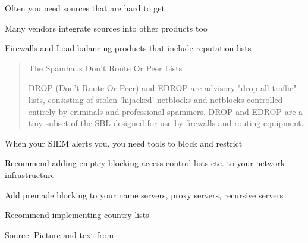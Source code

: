 \documentclass[Screen16to9,17pt]{foils}
\begin{document}
\begin{list2}
\item Often you need sources that are hard to get
\item Many vendors integrate sources into other products too
\item Firewalls and Load balancing products that include reputation lists
\end{list2}


\begin{quote}
The Spamhaus Don't Route Or Peer Lists

DROP (Don't Route Or Peer) and EDROP are advisory "drop all traffic" lists, consisting of stolen 'hijacked' netblocks and netblocks controlled entirely by criminals and professional spammers. DROP and EDROP are a tiny subset of the SBL designed for use by firewalls and routing equipment.
\end{quote}



\begin{list2}
\item When your SIEM alerts you, you need tools to block and restrict
\item Recommend adding emptry blocking access control lists etc. to your network infrastructure
\item Add premade blocking to your name servers, proxy servers, recursive servers
\item Recommend implementing country lists
\end{list2}

\slide{}


\begin{quote}

\end{quote}

\begin{list2}
  \item
  \item
  \item
  \item
\end{list2}






\begin{quote}

\end{quote}
Source: Picture and text from \link{}
\end{document}
